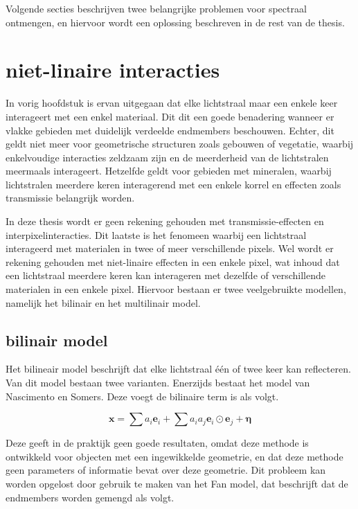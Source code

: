 \documentclass[12pt]{report}
\begin{document}
\vspace{5 mm}

Volgende secties beschrijven twee belangrijke problemen voor spectraal ontmengen, en hiervoor wordt een oplossing beschreven in de rest van de thesis.


\section{niet-linaire interacties}

In vorig hoofdstuk is ervan uitgegaan dat elke lichtstraal maar een enkele keer interageert met een enkel materiaal. Dit dit een goede benadering wanneer er vlakke gebieden met duidelijk verdeelde endmembers beschouwen. Echter, dit geldt niet meer voor geometrische structuren zoals gebouwen of vegetatie, waarbij enkelvoudige interacties zeldzaam zijn en de meerderheid van de lichtstralen meermaals interageert. Hetzelfde geldt voor gebieden met mineralen, waarbij lichtstralen meerdere keren interagerend met een enkele korrel en effecten zoals transmissie belangrijk worden.

In deze thesis wordt er geen rekening gehouden met transmissie-effecten en interpixelinteracties. Dit laatste is het fenomeen waarbij een lichtstraal interageerd met materialen in twee of meer verschillende pixels. Wel wordt er rekening gehouden met niet-linaire effecten in een enkele pixel, wat inhoud dat een lichtstraal meerdere keren kan interageren met dezelfde of verschillende materialen in een enkele pixel. Hiervoor bestaan er twee veelgebruikte modellen, namelijk het bilinair en het multilinair model.

\subsection{bilinair model}

Het bilineair model beschrijft dat elke lichtstraal \'e\'en of twee keer kan reflecteren. Van dit model bestaan twee varianten. Enerzijds bestaat het model van Nascimento en Somers\cite{mlinmix}. Deze voegt de bilinaire term is als volgt.

\begin{equation}
\bm{x} = \sum a_i \bm{e}_i + \sum a_i a_j \bm{e}_i \odot \bm{e}_j + \bm{\eta}
\end{equation}

Deze geeft in de praktijk geen goede resultaten, omdat deze methode is ontwikkeld voor objecten met een ingewikkelde geometrie, en dat deze methode geen parameters of informatie bevat over deze geometrie. Dit probleem kan worden opgelost door gebruik te maken van het Fan model\cite{mlinmix}, dat beschrijft dat de endmembers worden gemengd als volgt.
\end{document}
